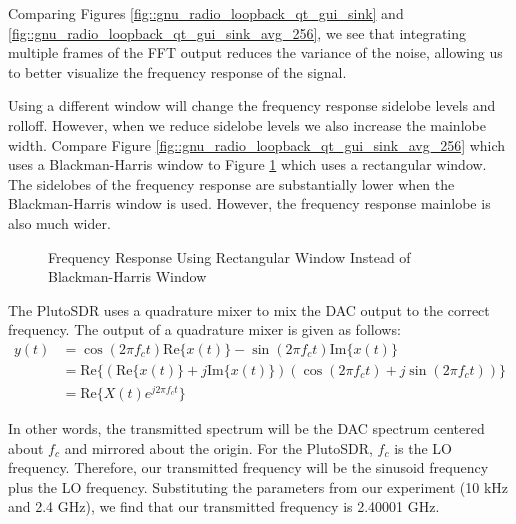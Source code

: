 \documentclass{article}
\begin{document}
Comparing Figures \ref{fig::gnu_radio_loopback_qt_gui_sink} and \ref{fig::gnu_radio_loopback_qt_gui_sink_avg_256}, we see that integrating multiple frames of the FFT output reduces the variance of the noise, allowing us to better visualize the frequency response of the signal. 

Using a different window will change the frequency response sidelobe levels and rolloff. However, when we reduce sidelobe levels we also increase the mainlobe width. Compare Figure \ref{fig::gnu_radio_loopback_qt_gui_sink_avg_256} which uses a Blackman-Harris window to Figure \ref{fig::gnu_radio_loopback_qt_gui_sink_rect_win} which uses a rectangular window. The sidelobes of the frequency response are substantially lower when the Blackman-Harris window is used. However, the frequency response mainlobe is also much wider.

\begin{figure}[H]
	\centerline{}
	\caption{Frequency Response Using Rectangular Window Instead of Blackman-Harris Window}
	\label{fig::gnu_radio_loopback_qt_gui_sink_rect_win}
\end{figure}

The PlutoSDR uses a quadrature mixer to mix the DAC output to the correct frequency. The output of a quadrature mixer is given as follows:
\begin{align}
	y(t) &= \cos(2{\pi}f_ct)\text{Re}\{x(t)\} - \sin(2{\pi}f_ct)\text{Im}\{x(t)\} \\
	&= \text{Re}\{(\text{Re}\{x(t)\} + j\text{Im}\{x(t)\})(\cos(2{\pi}f_ct) + j\sin(2{\pi}f_ct))\} \\
	&= \text{Re}\{X(t)e^{j2{\pi}f_ct}\}
\end{align}

In other words, the transmitted spectrum will be the DAC spectrum centered about $f_c$ and mirrored about the origin. For the PlutoSDR, $f_c$ is the LO frequency. Therefore, our transmitted frequency will be the sinusoid frequency plus the LO frequency. Substituting the parameters from our experiment (10 kHz and 2.4 GHz), we find that our transmitted frequency is 2.40001 GHz. 
\end{document}
